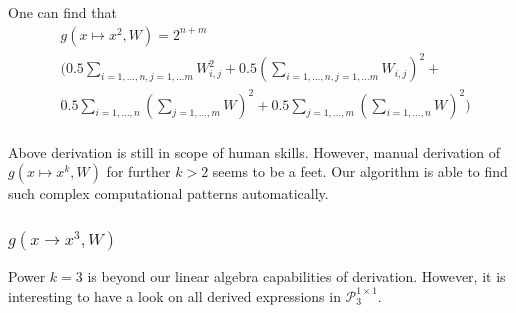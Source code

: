 \documentclass{article}
\begin{document}
One can find that 
\begin{align*}
	&g(x \mapsto x^2, W) = 2^{n + m} \\ 
 &\Big( 0.5\sum_{i = 1, \dots, n, j = 1, \dots m} W_{i, j}^2 + 0.5(\sum_{i = 1, \dots, n, j = 1, \dots m} W_{i, j})^2 + \\
 &0.5\sum_{i = 1, \dots, n}(\sum_{j = 1, \dots, m} W)^2 + 0.5\sum_{j = 1, \dots, m}(\sum_{i = 1, \dots, n} W)^2 \Big)\\
\end{align*}

Above derivation is still in scope of human skills. However, manual derivation
of $g(x \mapsto x^k, W)$ for further $k > 2$  seems to be a feet. Our algorithm
is able to find such complex computational patterns automatically. 

\subsubsection{$g(x \rightarrow x^3, W)$}
Power $k = 3$ is beyond our linear algebra capabilities of derivation. However, it is
interesting to have a look on all derived expressions in $\mathcal{P}^{1 \times 1}_3$. 
\end{document}
